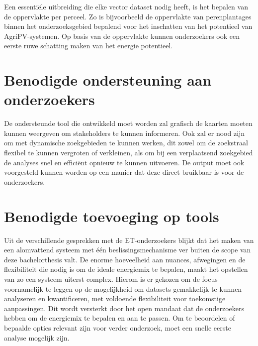 Een essentiële uitbreiding die elke vector dataset nodig heeft, is het bepalen van de oppervlakte per perceel. Zo is bijvoorbeeld de oppervlakte van perenplantages binnen het onderzoeksgebied bepalend voor het inschatten van het potentieel van AgriPV-systemen. Op basis van de oppervlakte kunnen onderzoekers ook een eerste ruwe schatting maken van het energie potentieel.

\section{Benodigde ondersteuning aan onderzoekers}
De ondersteunde tool die ontwikkeld moet worden zal grafisch de kaarten moeten kunnen weergeven om stakeholders te kunnen informeren. Ook zal er nood zijn om met dynamische zoekgebieden te kunnen werken, dit zowel om de zoekstraal flexibel te kunnen vergroten of verkleinen, als om bij een verplaatsend zoekgebied de analyses snel en efficiënt opnieuw te kunnen uitvoeren. De output moet ook voorgesteld kunnen worden op een manier dat deze direct bruikbaar is voor de onderzoekers.

\section{Benodigde toevoeging op tools}
Uit de verschillende gesprekken met de ET-onderzoekers blijkt dat het maken van een alomvattend systeem met één beslissingsmechanisme ver buiten de scope van deze bachelorthesis valt. De enorme hoeveelheid aan nuances, afwegingen en de flexibiliteit die nodig is om de ideale energiemix te bepalen, maakt het opstellen van zo een systeem uiterst complex. Hierom is er gekozen om de focus voornamelijk te leggen op de mogelijkheid om datasets gemakkelijk te kunnen analyseren en kwantificeren, met voldoende flexibiliteit voor toekomstige aanpassingen. Dit wordt versterkt door het open mandaat dat de onderzoekers hebben om de energiemix te bepalen en aan te passen. Om te beoordelen of bepaalde opties relevant zijn voor verder onderzoek, moet een snelle eerste analyse mogelijk zijn.